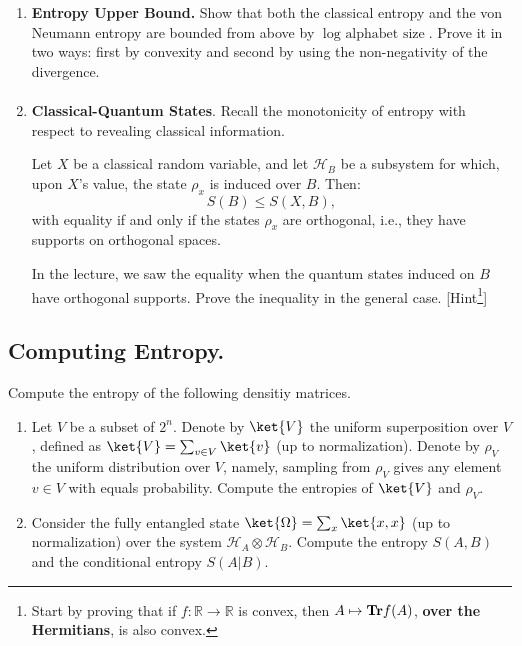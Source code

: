 \documentclass[12pt,a4paper]{article}
\begin{document}
\begin{enumerate}



  \item \textbf{Entropy Upper Bound.}
    Show that both the classical entropy and the von Neumann entropy are bounded from above by $\log \text{ alphabet size}$. Prove it in two ways: first by convexity and second by using the non-negativity of the divergence.

    \paragraph{ }

  \item \textbf{Classical-Quantum States}. Recall the monotonicity of entropy with respect to revealing classical information.
     \begin{claim}
Let $X$ be a classical random variable, and let $\mathcal{H}_B$ be a subsystem for which, upon $X$'s value, the state $\rho_{x}$ is induced over $B$. Then: 
       \[ S(B) \leq S(X,B), \]    
    with equality if and only if the states $\rho_x$ are orthogonal, i.e., they have supports on orthogonal spaces.\end{claim}
    In the lecture, we saw the equality when the quantum states induced on $B$ have orthogonal supports. Prove the inequality in the general case. [Hint\footnote{Start by proving that if $f : \mathbb{R} \rightarrow \mathbb{R}$ is convex, then $A \mapsto \mathbf{Tr} f(A)$, \textbf{over the Hermitians}, is also convex.}]

\end{enumerate}

    

\subsection{Computing Entropy.}
Compute the entropy of the following densitiy matrices. 
\begin{enumerate}

  \item Let $V$ be a subset of $2^{n}$. Denote by $\ket{V}$ the uniform superposition over $V$, defined as $\ket{V} = \sum_{v \in V}{\ket{v}}$ (up to normalization). Denote by $\rho_{V}$ the uniform distribution over $V$, namely, sampling from $\rho_{V}$ gives any element $v \in V$ with equals probability. Compute the entropies of $\ket{V}$ and $\rho_{V}$.
    

  \item  Consider the fully entangled state $\ket{\Omega} = \sum_{x}{\ket{x,x}}$ (up to normalization) over the system $\mathcal{H}_{A} \otimes \mathcal{H}_{B}$. Compute the entropy $S(A,B)$ and the conditional entropy $S(A|B)$.
  
  

\end{enumerate}
\end{document}
